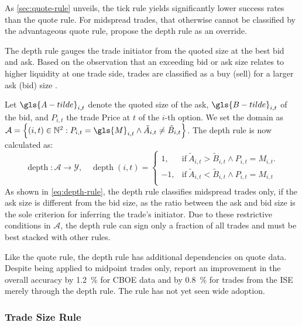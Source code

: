 As \cref{sec:quote-rule} unveils, the tick rule yields significantly lower success rates than the quote rule. For midspread trades, that otherwise cannot be classified by the advantageous quote rule, \textcite[][14]{grauerOptionTradeClassification2022} propose the depth rule as an override.

The depth rule gauges the trade initiator from the quoted size at the best bid and ask. Based on the observation that an exceeding bid or ask size relates to higher liquidity at one trade side, trades are classified as a buy (sell) for a larger ask (bid) size \autocite[][14]{grauerOptionTradeClassification2022}.

Let $\gls{A-tilde}_{i,t}$ denote the quoted size of the ask, $\gls{B-tilde}_{i,t}$ of the bid, and $P_{i,t}$ the trade Price at $t$ of the $i$-th option. We set the domain as $\mathcal{A} = \left\{(i, t) \in \mathbb{N}^2: P_{i,t} = \gls{M}_{i,t} \land \tilde{A}_{i,t} \neq \tilde{B}_{i,t} \right\}$. The depth rule is now calculated as:
\begin{equation}
    \operatorname{depth} \colon \mathcal{A} \to \mathcal{Y},\quad
    \operatorname{depth}(i, t)=
    \begin{cases}
        1,  & \mathrm{if}\ \tilde{A}_{i,t} > \tilde{B}_{i,t} \land P_{i, t} = M_{i, t}. \\
        -1, & \mathrm{if}\ \tilde{A}_{i,t} < \tilde{B}_{i,t} \land P_{i, t} = M_{i, t}  \\
    \end{cases}
    \label{eq:depth-rule}
\end{equation}
As shown in \cref{eq:depth-rule}, the depth rule classifies midspread trades only, if the ask size is different from the bid size, as the ratio between the ask and bid size is the sole criterion for inferring the trade's initiator. Due to these restrictive conditions in $\mathcal{A}$, the depth rule can sign only a fraction of all trades and must be best stacked with other rules.

Like the quote rule, the depth rule has additional dependencies on quote data. Despite being applied to midpoint trades only, \textcite[][4]{grauerOptionTradeClassification2022} report an improvement in the overall accuracy by \SI{1.2}{\percent} for \gls{CBOE} data and by \SI{0.8}{\percent} for trades from the \gls{ISE} merely through the depth rule. The rule has not yet seen wide adoption.

\subsubsection{Trade Size Rule}\label{sec:trade-size-rule}

